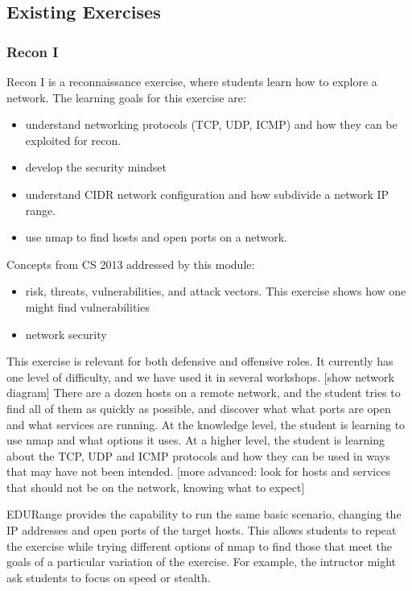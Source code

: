 \subsection{Existing Exercises}
\subsubsection{Recon I}
Recon I  is a reconnaissance exercise, where students learn how to explore a network.
The learning goals for this exercise are:
\begin{itemize}
\item understand networking protocols (TCP, UDP, ICMP) and how they can be exploited for recon.
\item develop the security mindset
\item understand CIDR network configuration and how subdivide a network IP range.
\item use nmap to find hosts and open ports on a network.
\end{itemize}
Concepts from CS 2013 addressed by this module:
\begin{itemize}
\item  risk, threats, vulnerabilities, and attack vectors.  This exercise shows how one might 
  find vulnerabilities
\item network security
\end{itemize}


This exercise is relevant for both defensive and offensive roles.  It currently has one level of difficulty,
and we have used it in several workshops.
[show network diagram]
There are a dozen hosts on a remote network, and the student tries to find all of them as quickly as 
possible, and discover what what ports are open and what services are running.  At the knowledge level,
the student is learning to use nmap and what options it uses.  At a higher level, the student is learning
about the TCP, UDP and ICMP protocols and how they can be used in ways that may have not been intended.
[more advanced: look for hosts and services that should not be on the network, knowing what to expect]

EDURange provides the capability to run the same basic scenario, changing the IP addresses and open ports
of the target hosts.  This allows students to repeat the exercise while trying different options of nmap to
find those that meet the goals of a particular variation of the exercise.  For example, the intructor
might ask students to focus on speed or stealth.

